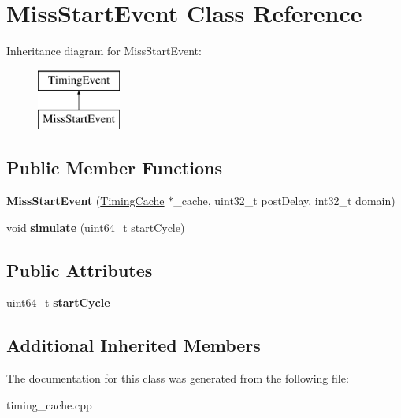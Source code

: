 \hypertarget{classMissStartEvent}{\section{Miss\-Start\-Event Class Reference}
\label{classMissStartEvent}
}
Inheritance diagram for Miss\-Start\-Event\-:\begin{figure}[H]
\begin{center}
\leavevmode
\includegraphics[height=2.000000cm]{classMissStartEvent}
\end{center}
\end{figure}
\subsection*{Public Member Functions}
\begin{DoxyCompactItemize}
\item 
\hypertarget{classMissStartEvent_aec85a6040c98eb304cd4431e044934a7}{{\bfseries Miss\-Start\-Event} (\hyperlink{classTimingCache}{Timing\-Cache} $\ast$\-\_\-cache, uint32\-\_\-t post\-Delay, int32\-\_\-t domain)}\label{classMissStartEvent_aec85a6040c98eb304cd4431e044934a7}

\item 
\hypertarget{classMissStartEvent_a690b99ec91256750af674ce937d334a8}{void {\bfseries simulate} (uint64\-\_\-t start\-Cycle)}\label{classMissStartEvent_a690b99ec91256750af674ce937d334a8}

\end{DoxyCompactItemize}
\subsection*{Public Attributes}
\begin{DoxyCompactItemize}
\item 
\hypertarget{classMissStartEvent_adb06a8fb059679c0f222f647be6bbab8}{uint64\-\_\-t {\bfseries start\-Cycle}}\label{classMissStartEvent_adb06a8fb059679c0f222f647be6bbab8}

\end{DoxyCompactItemize}
\subsection*{Additional Inherited Members}


The documentation for this class was generated from the following file\-:\begin{DoxyCompactItemize}
\item 
timing\-\_\-cache.\-cpp\end{DoxyCompactItemize}
